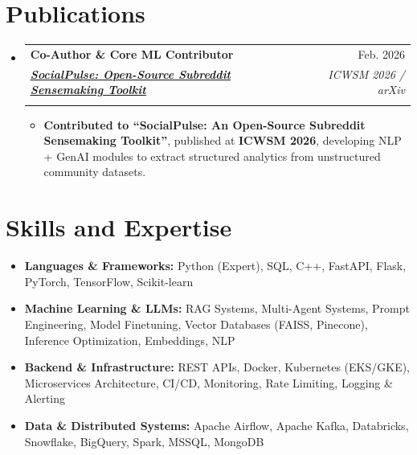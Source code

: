 \documentclass[letterpaper,11pt]{article}
\makeatletter
\newcommand{\resumeItem}[1]{
  \item\small{
    {#1 \vspace{-2pt}}
  }
}
\newcommand{\skillItem}[1]{
  \item\small{
    {#1 \vspace{-2pt}}
  }
}
\newcommand{\workExSubheading}[5]{
  \vspace{-2pt}\item
    \begin{tabular*}{0.97\textwidth}[t]{l@{\extracolsep{\fill}}r}
      \textbf{#1} & #2 \\
      \textit{\small#3} & \textit{\small #4} \\
      \multicolumn{2}{l}{\sloppy \textit{\small #5}}
    \end{tabular*}\vspace{-7pt}
}
\newcommand{\resumeSubHeadingListStart}{\begin{itemize}[leftmargin=0.15in, label={}]}
\newcommand{\resumeSubHeadingListEnd}{\end{itemize}}
\newcommand{\resumeItemListStart}{\begin{itemize}}
\newcommand{\resumeItemListEnd}{\end{itemize}\vspace{-5pt}}
\makeatother
\begin{document}
\section{Publications}
  \resumeSubHeadingListStart
    \workExSubheading
      {Co-Author \& Core ML Contributor}{Feb. 2026}
      {\href{https://arxiv.org/abs/2602.07248}
      {\underline{\textbf{SocialPulse: Open-Source Subreddit Sensemaking Toolkit}}}}{ICWSM 2026 / arXiv}
      {}
      \vspace{-14pt}
      \resumeItemListStart
    
        \resumeItem{\textbf{Contributed to “SocialPulse: An Open-Source Subreddit Sensemaking Toolkit”}, published at \textbf{ICWSM 2026}, developing NLP + GenAI modules to extract structured analytics from unstructured community datasets.}
    
      \resumeItemListEnd
  \resumeSubHeadingListEnd

\section{Skills and Expertise}
\begin{itemize}[leftmargin=0.15in, label={}]
    \skillItem{ \textbf{Languages \& Frameworks:} Python (Expert), SQL, C++, FastAPI, Flask, PyTorch, TensorFlow, Scikit-learn}
          \vspace{-4pt}
    \skillItem{ \textbf{Machine Learning \& LLMs:} RAG Systems, Multi-Agent Systems, Prompt Engineering, Model Finetuning, Vector Databases (FAISS, Pinecone), Inference Optimization, Embeddings, NLP}
          \vspace{-4pt}
    \skillItem{ \textbf{Backend \& Infrastructure:} REST APIs, Docker, Kubernetes (EKS/GKE), Microservices Architecture, CI/CD, Monitoring, Rate Limiting, Logging \& Alerting}
          \vspace{-4pt}
    \skillItem{ \textbf{Data \& Distributed Systems:} Apache Airflow, Apache Kafka, Databricks, Snowflake, BigQuery, Spark, MSSQL, MongoDB}
          \vspace{-4pt}
\end{itemize}

\end{document}
